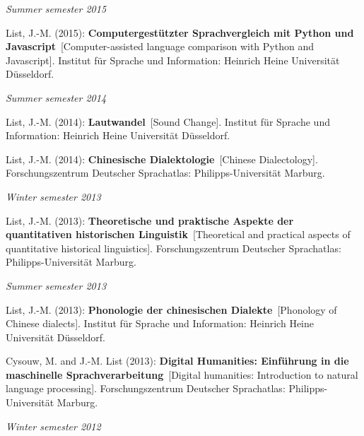 \noindent\textit{Summer semester 2015}\par\nopagebreak\vspace{0.25cm}
\nopagebreak\noindent List, J.-M. (2015): \textbf{Computergestützter Sprachvergleich mit Python und Javascript}\ [Computer-assisted language comparison with Python and Javascript]. Institut für Sprache und Information: Heinrich Heine Universität Düsseldorf.\vspace{0.25cm}
\par
\noindent\textit{Summer semester 2014}\par\nopagebreak\vspace{0.25cm}
\nopagebreak\noindent List, J.-M. (2014): \textbf{Lautwandel}\ [Sound Change]. Institut für Sprache und Information: Heinrich Heine Universität Düsseldorf.\vspace{0.25cm}
\par
\nopagebreak\noindent List, J.-M. (2014): \textbf{Chinesische Dialektologie}\ [Chinese Dialectology]. Forschungszentrum Deutscher Sprachatlas: Philipps-Universität Marburg.\vspace{0.25cm}
\par
\noindent\textit{Winter semester 2013}\par\nopagebreak\vspace{0.25cm}
\nopagebreak\noindent List, J.-M. (2013): \textbf{Theoretische und praktische Aspekte der quantitativen historischen Linguistik}\ [Theoretical and practical aspects of quantitative historical linguistics]. Forschungszentrum Deutscher Sprachatlas: Philipps-Universität Marburg.\vspace{0.25cm}
\par
\noindent\textit{Summer semester 2013}\par\nopagebreak\vspace{0.25cm}
\nopagebreak\noindent List, J.-M. (2013): \textbf{Phonologie der chinesischen Dialekte}\ [Phonology of Chinese dialects]. Institut für Sprache und Information: Heinrich Heine Universität Düsseldorf.\vspace{0.25cm}
\par
\nopagebreak\noindent Cysouw, M. and J.-M. List (2013): \textbf{Digital Humanities: Einführung in die maschinelle Sprachverarbeitung}\ [Digital humanities: Introduction to natural language processing]. Forschungszentrum Deutscher Sprachatlas: Philipps-Universität Marburg.\vspace{0.25cm}
\par
\noindent\textit{Winter semester 2012}\par\nopagebreak\vspace{0.25cm}
